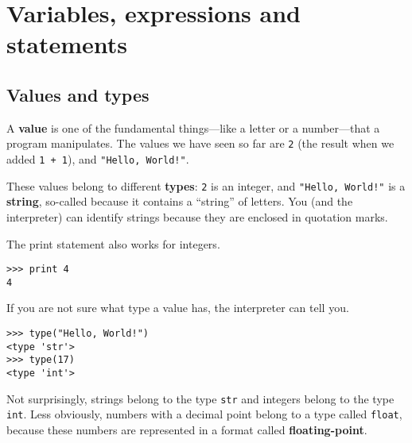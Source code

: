 

\chapter{Variables, expressions and statements}

\section{Values and types}

A {\bf value} is one of the fundamental things---like a letter or a
number---that a program manipulates.  The values we have seen so far
are {\tt 2} (the result when we added {\tt 1 + 1}), and
{\tt "Hello, World!"}.

These values belong to different {\bf types}:
{\tt 2} is an integer, and {\tt "Hello, World!"} is a {\bf string},
so-called because it contains a ``string'' of letters.
You (and the interpreter) can identify
strings because they are enclosed in quotation marks.

The print statement also works for integers.

\beforeverb
\begin{verbatim}
>>> print 4
4
\end{verbatim}
\afterverb
%
If you are not sure what type a value has,
the interpreter can tell you.

\beforeverb
\begin{verbatim}
>>> type("Hello, World!")
<type 'str'>
>>> type(17)
<type 'int'>
\end{verbatim}
\afterverb
%
Not surprisingly, strings belong to the type {\tt str} and
integers belong to the type {\tt int}.  Less obviously, numbers
with a decimal point belong to a type called {\tt float},
because these numbers are represented in a
format called {\bf floating-point}.

